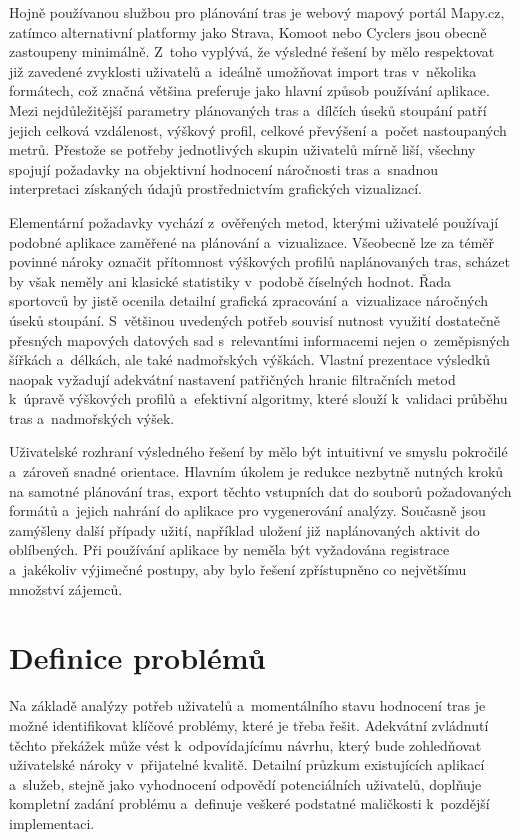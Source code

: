 Hojně používanou službou pro plánování tras je webový mapový portál Mapy.cz, zatímco alternativní platformy jako Strava, Komoot nebo Cyclers jsou obecně zastoupeny minimálně.
Z~toho vyplývá, že výsledné řešení by mělo respektovat již zavedené zvyklosti uživatelů a~ideálně umožňovat import tras v~několika formátech, což značná většina preferuje jako hlavní způsob používání aplikace.
Mezi nejdůležitější parametry plánovaných tras a~dílčích úseků stoupání patří jejich celková vzdálenost, výškový profil, celkové převýšení a~počet nastoupaných metrů.
Přestože se potřeby jednotlivých skupin uživatelů mírně liší, všechny spojují požadavky na objektivní hodnocení náročnosti tras a~snadnou interpretaci získaných údajů prostřednictvím grafických vizualizací.

Elementární požadavky vychází z~ověřených metod, kterými uživatelé používají podobné aplikace zaměřené na plánování a~vizualizace.
Všeobecně lze za téměř povinné nároky označit přítomnost výškových profilů naplánovaných tras, scházet by však neměly ani klasické statistiky v~podobě číselných hodnot.
Řada sportovců by jistě ocenila detailní grafická zpracování a~vizualizace náročných úseků stoupání.
S~většinou uvedených potřeb souvisí nutnost využití dostatečně přesných mapových datových sad s~relevantími informacemi nejen o~zeměpisných šířkách a~délkách, ale také nadmořských výškách.
Vlastní prezentace výsledků naopak vyžadují adekvátní nastavení patřičných hranic filtračních metod k~úpravě výškových profilů a~efektivní algoritmy, které slouží k~validaci průběhu tras a~nadmořských výšek.

Uživatelské rozhraní výsledného řešení by mělo být intuitivní ve smyslu pokročilé a~zároveň snadné orientace.
Hlavním úkolem je redukce nezbytně nutných kroků na samotné plánování tras, export těchto vstupních dat do souborů požadovaných formátů a~jejich nahrání do aplikace pro vygenerování analýzy.
Současně jsou zamýšleny další případy užití, například uložení již naplánovaných aktivit do oblíbených.
Při používání aplikace by neměla být vyžadována registrace a~jakékoliv výjimečné postupy, aby bylo řešení zpřístupněno co největšímu množství zájemců.

\section{Definice problémů}
\label{problem-definition}

Na základě analýzy potřeb uživatelů a~momentálního stavu hodnocení tras je možné identifikovat klíčové problémy, které je třeba řešit.
Adekvátní zvládnutí těchto překážek může vést k~odpovídajícímu návrhu, který bude zohledňovat uživatelské nároky v~přijatelné kvalitě.
Detailní průzkum existujících aplikací a~služeb, stejně jako vyhodnocení odpovědí potenciálních uživatelů, doplňuje kompletní zadání problému a~definuje veškeré podstatné maličkosti k~pozdější implementaci.


